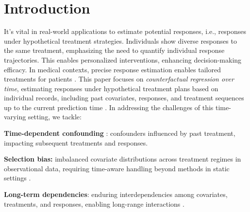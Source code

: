 \documentclass{article}
\theoremstyle{plain}
\theoremstyle{definition}
\theoremstyle{remark}
\begin{document}
\section{Introduction}
\label{sect: intro}
It's vital in real-world applications to estimate potential responses, i.e., responses under hypothetical treatment strategies. Individuals show diverse responses to the same treatment, emphasizing the need to quantify individual response trajectories. This enables personalized interventions, enhancing decision-making efficacy. In medical contexts, precise response estimation enables tailored treatments for patients \citep{atan2018Deep-Treat, shalit2020ITPolicyClinical, mueller2023personalized}. This paper focuses on \emph{counterfactual regression over time}, estimating responses under hypothetical treatment plans based on individual records, including past covariates, responses, and treatment sequences up to the current prediction time \citep{robins2000MSM, robins-time-varying-exposures}. In addressing the challenges of this time-varying setting, we tackle:
\begin{inparaenum}[(1)]
\item \textbf{Time-dependent confounding }\citep{platt2009time}: confounders influenced by past treatment, impacting subsequent treatments and responses.
\item \textbf{Selection bias:} imbalanced covariate distributions across treatment regimes in observational data, requiring time-aware handling beyond methods in static settings \citep{robins2000MSM, schisterman2009overadjustment, lim2018RMSM}.
\item \textbf{Long-term dependencies}: enduring interdependencies among covariates, treatments, and responses, enabling long-range interactions \citep{choi2016retain, pham2017predicting}. 
\end{inparaenum}
\end{document}

